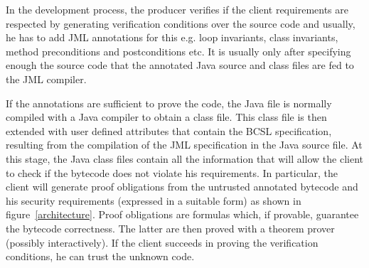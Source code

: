 
In the development process, the producer verifies if the client requirements are respected by generating verification conditions
over the source code and usually, he has to add JML annotations for this e.g. loop invariants, class invariants, method preconditions
 and postconditions etc. It is usually only after specifying enough the source code that the annotated Java source and class files are fed to the JML compiler.

If the annotations are sufficient to prove the code, 
the Java file is normally compiled with a Java compiler to obtain a 
class file. This class file is then extended with user defined attributes that contain the BCSL specification, 
resulting from the compilation of the JML specification in the Java source file. 
At this stage, the Java class files contain all the information that will allow the client to check if the bytecode does not violate 
his requirements. 
In particular, the client will generate proof obligations from the untrusted annotated bytecode and his security requirements 
(expressed in a suitable form) as shown in figure~\ref{architecture}. Proof obligations are formulas which, if provable, guarantee the bytecode correctness.
The latter are then proved with a theorem prover (possibly interactively). If the client succeeds in proving 
the verification conditions, he can trust the unknown code. 

